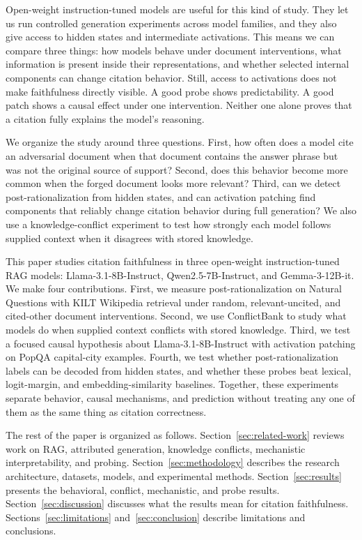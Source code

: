 \documentclass[11pt]{article}
\begin{document}
Open-weight instruction-tuned models are useful for this kind of study. They let us run controlled generation experiments across model families, and they also give access to hidden states and intermediate activations. This means we can compare three things: how models behave under document interventions, what information is present inside their representations, and whether selected internal components can change citation behavior. Still, access to activations does not make faithfulness directly visible. A good probe shows predictability. A good patch shows a causal effect under one intervention. Neither one alone proves that a citation fully explains the model's reasoning.

We organize the study around three questions. First, how often does a model cite an adversarial document when that document contains the answer phrase but was not the original source of support? Second, does this behavior become more common when the forged document looks more relevant? Third, can we detect post-rationalization from hidden states, and can activation patching find components that reliably change citation behavior during full generation? We also use a knowledge-conflict experiment to test how strongly each model follows supplied context when it disagrees with stored knowledge.

This paper studies citation faithfulness in three open-weight instruction-tuned RAG models: Llama-3.1-8B-Instruct, Qwen2.5-7B-Instruct, and Gemma-3-12B-it. We make four contributions. First, we measure post-rationalization on Natural Questions with KILT Wikipedia retrieval under random, relevant-uncited, and cited-other document interventions. Second, we use ConflictBank to study what models do when supplied context conflicts with stored knowledge. Third, we test a focused causal hypothesis about Llama-3.1-8B-Instruct with activation patching on PopQA capital-city examples. Fourth, we test whether post-rationalization labels can be decoded from hidden states, and whether these probes beat lexical, logit-margin, and embedding-similarity baselines. Together, these experiments separate behavior, causal mechanisms, and prediction without treating any one of them as the same thing as citation correctness.

The rest of the paper is organized as follows. Section~\ref{sec:related-work} reviews work on RAG, attributed generation, knowledge conflicts, mechanistic interpretability, and probing. Section~\ref{sec:methodology} describes the research architecture, datasets, models, and experimental methods. Section~\ref{sec:results} presents the behavioral, conflict, mechanistic, and probe results. Section~\ref{sec:discussion} discusses what the results mean for citation faithfulness. Sections~\ref{sec:limitations} and~\ref{sec:conclusion} describe limitations and conclusions.
\end{document}
